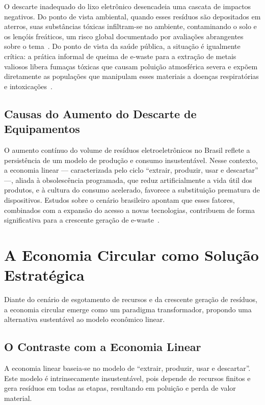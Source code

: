 \documentclass[
	12pt,				%
	openright,			%
	oneside,			%
	a4paper,			%
	english,			%
	brazil				%
	]{abntex2}
\theoremstyle{definition}
\begin{document}
O descarte inadequado do lixo eletrônico desencadeia uma cascata de impactos negativos. Do ponto de vista ambiental, quando esses resíduos são depositados em aterros, suas substâncias tóxicas infiltram-se no ambiente, contaminando o solo e os lençóis freáticos, um risco global documentado por avaliações abrangentes sobre o tema~\cite{Robinson2009}. Do ponto de vista da saúde pública, a situação é igualmente crítica: a prática informal de queima de e-waste para a extração de metais valiosos libera fumaças tóxicas que causam poluição atmosférica severa e expõem diretamente as populações que manipulam esses materiais a doenças respiratórias e intoxicações~\cite{Heacock2016}.

\subsection{Causas do Aumento do Descarte de Equipamentos}

O aumento contínuo do volume de resíduos eletroeletrônicos no Brasil reflete a persistência de um modelo de produção e consumo insustentável. Nesse contexto, a economia linear — caracterizada pelo ciclo “extrair, produzir, usar e descartar” —, aliada à obsolescência programada, que reduz artificialmente a vida útil dos produtos, e à cultura do consumo acelerado, favorece a substituição prematura de dispositivos. Estudos sobre o cenário brasileiro apontam que esses fatores, combinados com a expansão do acesso a novas tecnologias, contribuem de forma significativa para a crescente geração de e-waste~\cite{Rossini2017, Forti2020}.

\section{A Economia Circular como Solução Estratégica}

Diante do cenário de esgotamento de recursos e da crescente geração de resíduos, a economia circular emerge como um paradigma transformador, propondo uma alternativa sustentável ao modelo econômico linear.

\subsection{O Contraste com a Economia Linear}

A economia linear baseia-se no modelo de ``extrair, produzir, usar e descartar''. Este modelo é intrinsecamente insustentável, pois depende de recursos finitos e gera resíduos em todas as etapas, resultando em poluição e perda de valor material.
\end{document}
